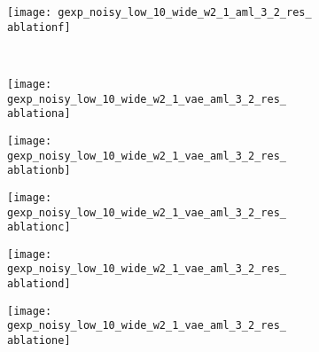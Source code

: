 \begin{figure}[tp]
{\begin{subfigure}[t]{0.07\textwidth}
    \end{subfigure}
    \begin{subfigure}[t]{0.07\textwidth}
        \vspace{0px}\centering
        \texttt{[image: gexp\_noisy\_low\_10\_wide\_w2\_1\_aml\_3\_2\_res\_\\ablationf]}
    \end{subfigure}
    \\[-4px]
    \begin{subfigure}[t]{0.01\textwidth}
        \vspace{0px}\centering
    \end{subfigure}
    \begin{subfigure}[t]{0.07\textwidth}
        \vspace{0px}\centering
        \texttt{[image: gexp\_noisy\_low\_10\_wide\_w2\_1\_vae\_aml\_3\_2\_res\_\\ablationa]}
    \end{subfigure}
    \begin{subfigure}[t]{0.07\textwidth}
        \vspace{0px}\centering
        \texttt{[image: gexp\_noisy\_low\_10\_wide\_w2\_1\_vae\_aml\_3\_2\_res\_\\ablationb]}
    \end{subfigure}
    \begin{subfigure}[t]{0.07\textwidth}
        \vspace{0px}\centering
        \texttt{[image: gexp\_noisy\_low\_10\_wide\_w2\_1\_vae\_aml\_3\_2\_res\_\\ablationc]}
    \end{subfigure}
    \begin{subfigure}[t]{0.07\textwidth}
        \vspace{0px}\centering
        \texttt{[image: gexp\_noisy\_low\_10\_wide\_w2\_1\_vae\_aml\_3\_2\_res\_\\ablationd]}
    \end{subfigure}
    \begin{subfigure}[t]{0.07\textwidth}
        \vspace{0px}\centering
        \texttt{[image: gexp\_noisy\_low\_10\_wide\_w2\_1\_vae\_aml\_3\_2\_res\_\\ablatione]}
    \end{subfigure}
}
\end{figure}
